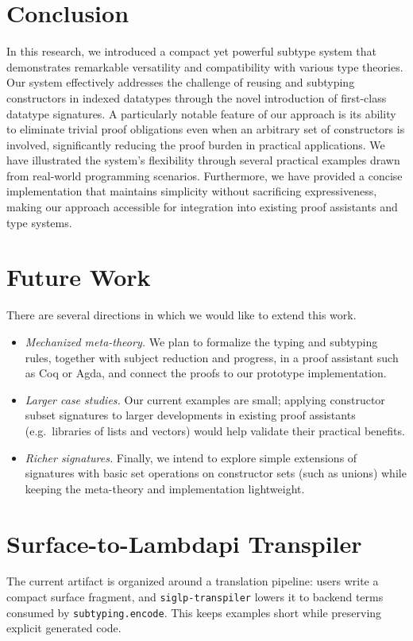 \documentclass[a4paper, anonymous, UKenglish,cleveref, autoref, thm-restate]{lipics-v2021}
\begin{document}
\section{Conclusion}
\label{sec:conclusion}
In this research, we introduced a compact yet powerful subtype system that demonstrates remarkable versatility and compatibility with various type theories. Our system effectively addresses the challenge of reusing and subtyping constructors in indexed datatypes through the novel introduction of first-class datatype signatures. A particularly notable feature of our approach is its ability to eliminate trivial proof obligations even when an arbitrary set of constructors is involved, significantly reducing the proof burden in practical applications. We have illustrated the system's flexibility through several practical examples drawn from real-world programming scenarios. Furthermore, we have provided a concise implementation that maintains simplicity without sacrificing expressiveness, making our approach accessible for integration into existing proof assistants and type systems.

\section{Future Work}
There are several directions in which we would like to extend this work.

\begin{itemize}
\item \emph{Mechanized meta-theory.} We plan to formalize the typing and subtyping rules, together with subject reduction and progress, in a proof assistant such as Coq or Agda, and connect the proofs to our prototype implementation.
\item \emph{Larger case studies.} Our current examples are small; applying constructor subset signatures to larger developments in existing proof assistants (e.g.\ libraries of lists and vectors) would help validate their practical benefits.
\item \emph{Richer signatures.} Finally, we intend to explore simple extensions of signatures with basic set operations on constructor sets (such as unions) while keeping the meta-theory and implementation lightweight.
\end{itemize}

\appendix

\section{Surface-to-Lambdapi Transpiler}
\label{app:transpiler}
The current artifact is organized around a translation pipeline: users write a compact surface fragment, and \texttt{siglp-transpiler} lowers it to backend terms consumed by \texttt{subtyping.encode}. This keeps examples short while preserving explicit generated code.
\end{document}

